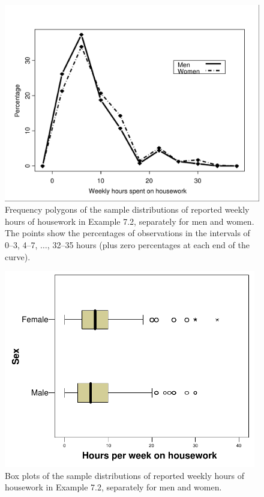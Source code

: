 \begin{figure}
\caption{Frequency polygons of the sample distributions of reported
weekly hours of housework in Example 7.2, separately for men and women.
The points show the percentages of observations in the intervals of 0--3,
4--7, $\dots$, 32--35 hours (plus zero percentages at each end of
the curve).}
\label{f_hworkpolygons}
\begin{center}
\includegraphics[width=11.5cm]{hwork}
\end{center}

\end{figure}

\begin{figure}
\caption{Box plots of the sample distributions of reported
weekly hours of housework in Example 7.2, separately for men and women.}
\label{f_twoboxplots}

\begin{center}
\includegraphics[width=11cm]{twoboxplots}

\end{center}
\end{figure}

